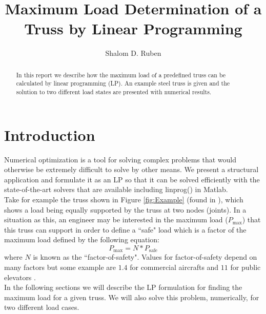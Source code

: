 \documentclass[12pt]{article}
\title{Maximum Load Determination of a Truss by Linear Programming}
\author{Shalom D. Ruben}
\date{}
\begin{document}
\maketitle

\begin{abstract}
In this report we describe how the maximum load of a predefined truss can be calculated by linear programming (LP).  An example steel truss is given and the solution to two different load states are presented with numerical results.
\end{abstract}

\section{Introduction}
Numerical optimization is a tool for solving complex problems that would otherwise be extremely difficult to solve by other means.  We present a structural application and formulate it as an LP so that it can be solved efficiently with the state-of-the-art solvers that are available including linprog() in Matlab.\\

Take for example the truss shown in Figure \ref{fig:Example} (found in \cite{EngOpt}), which shows a load being equally supported by the truss at two nodes (joints).  In a situation as this, an engineer may be interested in the maximum load ($P_\textrm{max}$) that this truss can support in order to define a ``safe" load which is a factor of the maximum load defined by the following equation:
\begin{equation}
P_\textrm{max} = N*P_\textrm{safe}
\end{equation}
where $N$ is known as the ``factor-of-safety".  Values for factor-of-safety depend on many factors but some example are $1.4$ for commercial aircrafts and $11$ for public elevators \cite{MachineDesign}.\\

In the following sections we will describe the LP formulation for finding the maximum load for a given truss.  We will also solve this problem, numerically, for two different load cases.
\end{document}
